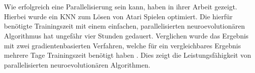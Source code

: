 \\\\
Wie erfolgreich eine Parallelisierung sein kann, haben \citeauthor*{such2017deep} in ihrer Arbeit gezeigt. Hierbei wurde ein \ac{KNN} zum Lösen von Atari Spielen optimiert. Die hierfür benötigte Trainingszeit mit einem einfachen, parallelisierten neuroevolutionären Algorithmus hat ungefähr vier Stunden gedauert. Verglichen wurde das Ergebnis mit zwei gradientenbasierten Verfahren, welche für ein vergleichbares Ergebnis mehrere Tage Trainingszeit benötigt haben \cite{such2017deep}. Dies zeigt die Leistungsfähigkeit von parallelisierten neuroevolutionären Algorithmen.



